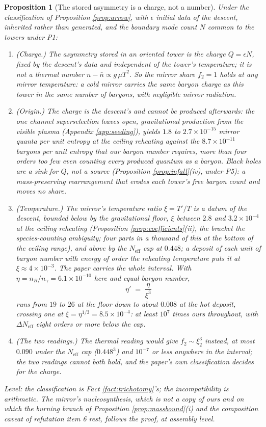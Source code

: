 \documentclass[11pt]{article}
\newtheorem{proposition}[theorem]{Proposition}
\theoremstyle{definition}
\newcommand{\Neff}{N_{\mathrm{eff}}}
\begin{document}
\begin{proposition}[The stored asymmetry is a charge, not a number]\label{prop:charge}
Under the classification of Proposition \ref{prop:arrow}, with $\epsilon$ initial data of the descent, inherited rather than generated, and the boundary mode count $N$ common to the towers under P1:
\begin{enumerate}
\item[(i)] \emph{(Charge.)} The asymmetry stored in an oriented tower is the charge $Q = \epsilon N$, fixed by the descent's data and independent of the tower's temperature; it is not a thermal number $n - \bar{n} \propto g\,\mu T^{2}$. So the mirror share $f_{2} = 1$ holds at any mirror temperature: a cold mirror carries the same baryon charge as this tower in the same number of baryons, with negligible mirror radiation.
\item[(ii)] \emph{(Origin.)} The charge is the descent's and cannot be produced afterwards: the one channel superselection leaves open, gravitational production from the visible plasma (Appendix \ref{app:seeding}), yields $1.8$ to $2.7 \times 10^{-15}$ mirror quanta per unit entropy at the ceiling reheating against the $8.7 \times 10^{-11}$ baryons per unit entropy that our baryon number requires, more than four orders too few even counting every produced quantum as a baryon. Black holes are a sink for $Q$, not a source (Proposition \ref{prop:infall}(iv), under P5): a mass-preserving rearrangement that erodes each tower's free baryon count and moves no share.
\item[(iii)] \emph{(Temperature.)} The mirror's temperature ratio $\xi = T'/T$ is a datum of the descent, bounded below by the gravitational floor, $\xi$ between $2.8$ and $3.2 \times 10^{-4}$ at the ceiling reheating (Proposition \ref{prop:coefficients}(ii), the bracket the species-counting ambiguity; four parts in a thousand of this at the bottom of the ceiling range), and above by the $\Neff$ cap at $0.448$; a deposit of each unit of baryon number with energy of order the reheating temperature puts it at $\xi \approx 4 \times 10^{-3}$. The paper carries the whole interval. With $\eta = n_{B}/n_{\gamma} = 6.1 \times 10^{-10}$ here and equal baryon number,
\[
\eta' \;=\; \frac{\eta}{\xi^{3}}
\]
runs from $19$ to $26$ at the floor down to about $0.008$ at the hot deposit, crossing one at $\xi = \eta^{1/3} = 8.5 \times 10^{-4}$: at least $10^{7}$ times ours throughout, with $\Delta\Neff$ eight orders or more below the cap.
\item[(iv)] \emph{(The two readings.)} The thermal reading would give $f_{2} \sim \xi_{2}^{3}$ instead, at most $0.090$ under the $\Neff$ cap ($0.448^{3}$) and $10^{-7}$ or less anywhere in the interval; the two readings cannot both hold, and the paper's own classification decides for the charge.
\end{enumerate}
Level: the classification is Fact \ref{fact:trichotomy}'s; the incompatibility is arithmetic. The mirror's nucleosynthesis, which is not a copy of ours and on which the burning branch of Proposition \ref{prop:massbound}(i) and the composition caveat of refutation item 6 rest, follows the proof, at assembly level.
\end{proposition}
\end{document}
